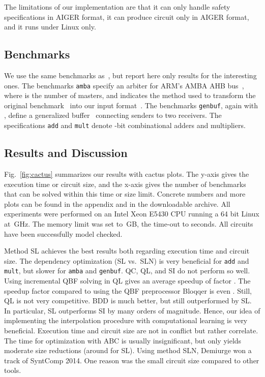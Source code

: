 \documentclass[conference]{IEEEtran}
\newcommand{\bloqqer}{\textsf{Bloqqer}\xspace}
\newcommand{\demiurge}{\textsf{Demiurge}\xspace}
\newcommand{\Abc}{\textsf{ABC}\xspace}
\newcommand{\aiger}{\textsf{AIGER}\xspace}
\begin{document}
The limitations of our implementation are that it can only handle safety 
specifications in \aiger format, it can produce circuit only in \aiger format, 
and it runs under Linux only.

\subsection{Benchmarks}

We use the same benchmarks as~\cite{BloemKS14}, but report here only results for 
the interesting ones.  The benchmarks \texttt{amba} specify an arbiter 
for ARM's AMBA AHB bus~\cite{BloemGJPPW07}, where  is the number of masters, 
and  indicates the method used to 
transform the original benchmark~\cite{BloemGJPPW07} into our input 
format~\cite{BloemKS14}.  The benchmarks \texttt{genbuf}, again with 
, define a generalized 
buffer~\cite{BloemGJPPW07} connecting  senders to two receivers.  The 
specifications \texttt{add} and \texttt{mult} denote -bit combinational 
adders and multipliers.

\subsection{Results and Discussion}

Fig.~\ref{fig:cactus} summarizes our results with cactus plots. The y-axis gives 
the execution time or circuit size, and the x-axis gives the number of 
benchmarks that can be solved within this time or size limit. Concrete numbers 
and more plots can be found in the appendix and in the downloadable archive.  
All experiments were performed on an Intel 
Xeon E5430 CPU running a 64 bit Linux at \,GHz. The memory limit was set 
to \,GB, the time-out to  seconds. All circuits have been 
successfully model checked.

Method \textsf{SL} achieves the best results both regarding execution time and 
circuit size.  The dependency optimization (\textsf{SL} vs.~\textsf{SLN}) is 
very beneficial for \texttt{add} and \texttt{mult}, but slower for \texttt{amba} 
and \texttt{genbuf}.  \textsf{QC}, \textsf{QL}, and \textsf{SI} do not perform 
so well.  Using incremental QBF solving in \textsf{QL} gives an average speedup 
of factor .  The speedup factor compared to using the QBF preprocessor 
\bloqqer is even .  Still, \textsf{QL} is not very competitive. \textsf{BDD} 
is much better, but still outperformed by \textsf{SL}. In particular, 
\textsf{SL} outperforms \textsf{SI} by many orders of magnitude. Hence, our idea 
of implementing the interpolation procedure with computational learning is very 
beneficial.  Execution time and circuit size are not in conflict but rather 
correlate.  The time for optimization with \Abc is usually insignificant, but 
only yields moderate size reductions (around  for SL).
Using method \textsf{SLN}, \demiurge won a track of 
\textsf{SyntComp} 2014.
One reason was the small circuit size compared to other tools.
\end{document}

